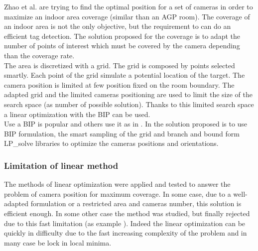 Zhao  et al. \cite{22*zhao2008} are trying to find the optimal position for a set of cameras in order to maximize an indoor area coverage (similar than an AGP room). The coverage of an indoor area is not the only objective, but the requirement to can  do an efficient tag detection.
The solution proposed for the coverage is to adapt the number of points of interest which must be covered by the camera depending than the coverage rate. \\
The area is discretized with a grid.  The grid is composed by points selected smartly. Each point of the grid simulate a potential location of the target.
The camera position is limited at few position fixed on the room boundary.
The adapted grid and the limited cameras positioning are used to limit the size of the search space (as number of possible solution). Thanks to this limited search space a linear optimization with the BIP can be used. \\
Use a BIP is popular and others use it as in \cite{22*zhao2008,43*erdem2006}. In \cite{22*zhao2008} the solution proposed is to use BIP formulation, the smart sampling of the grid and branch and bound form LP\_solve libraries to optimize the cameras positions and orientations.\\


\subsubsection{Limitation of linear method}
The methods of linear optimization were applied and tested to answer the problem of camera position for maximum coverage. In some case, due to a well-adapted formulation or a restricted area and cameras number, this solution is efficient enough. In some other case the method was studied, but finally rejected due to this fast limitation (as example \cite{141*akbarzadeh2013,151*zhao2013,82*chrysostomou2012}). Indeed the linear optimization can be quickly in difficulty due to the fast increasing complexity of the problem and in many case be lock in local minima.

